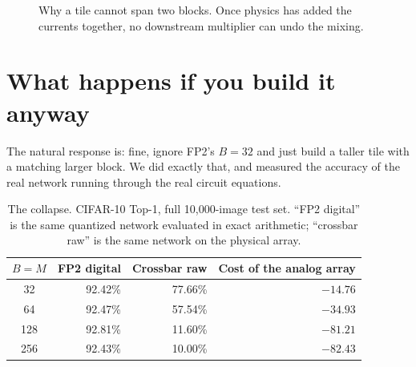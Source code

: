 \documentclass[11pt,a4paper]{report}
\begin{document}
\begin{figure}[h]
\centering
{}
\caption{Why a tile cannot span two blocks. Once physics has added the
currents together, no downstream multiplier can undo the mixing.}
\end{figure}

\section{What happens if you build it anyway}

The natural response is: fine, ignore FP2's $B=32$ and just build a taller
tile with a matching larger block. We did exactly that, and measured the
accuracy of the real network running through the real circuit equations.

\begin{table}[h]
\centering
\caption{The collapse. CIFAR-10 Top-1, full 10{,}000-image test set.
``FP2 digital'' is the same quantized network evaluated in exact arithmetic;
``crossbar raw'' is the same network on the physical array.}
\begin{tabular}{crrr}
\toprule
$B = M$ & FP2 digital & Crossbar raw & Cost of the analog array \\
\midrule
32  & 92.42\% & 77.66\% & $-14.76$ \\
64  & 92.47\% & 57.54\% & $-34.93$ \\
128 & 92.81\% & 11.60\% & $-81.21$ \\
256 & 92.43\% & 10.00\% & $-82.43$ \\
\bottomrule
\end{tabular}
\end{table}
\end{document}
